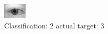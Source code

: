 \begin{figure}[h!]
\begin{center}
\includegraphics[width=0.60\columnwidth]{figures/ID552_class_2_target_3.png}
\end{center}
\caption{ Classification: 2 actual target: 3}
\label{fig:ID552_class_2_target_3}
\end{figure}
